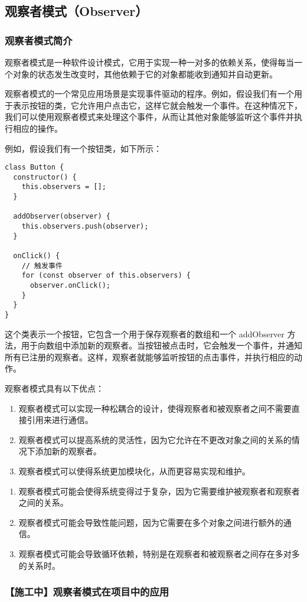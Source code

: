 \subsection{观察者模式（Observer）}

\subsubsection{观察者模式简介}

观察者模式是一种软件设计模式，它用于实现一种一对多的依赖关系，使得每当一个对象的状态发生改变时，其他依赖于它的对象都能收到通知并自动更新。

观察者模式的一个常见应用场景是实现事件驱动的程序。例如，假设我们有一个用于表示按钮的类，它允许用户点击它，这样它就会触发一个事件。在这种情况下，我们可以使用观察者模式来处理这个事件，从而让其他对象能够监听这个事件并执行相应的操作。

例如，假设我们有一个按钮类，如下所示：

\begin{lstlisting}
class Button {
  constructor() {
    this.observers = [];
  }

  addObserver(observer) {
    this.observers.push(observer);
  }

  onClick() {
    // 触发事件
    for (const observer of this.observers) {
      observer.onClick();
    }
  }
}
\end{lstlisting}


这个类表示一个按钮，它包含一个用于保存观察者的数组和一个 addObserver 方法，用于向数组中添加新的观察者。当按钮被点击时，它会触发一个事件，并通知所有已注册的观察者。这样，观察者就能够监听按钮的点击事件，并执行相应的动作。

观察者模式具有以下优点：

\begin{enumerate}
\item 观察者模式可以实现一种松耦合的设计，使得观察者和被观察者之间不需要直接引用来进行通信。
\item 观察者模式可以提高系统的灵活性，因为它允许在不更改对象之间的关系的情况下添加新的观察者。
\item 观察者模式可以使得系统更加模块化，从而更容易实现和维护。
\end{enumerate}

\begin{enumerate}
\item 观察者模式可能会使得系统变得过于复杂，因为它需要维护被观察者和观察者之间的关系。
\item 观察者模式可能会导致性能问题，因为它需要在多个对象之间进行额外的通信。
\item 观察者模式可能会导致循环依赖，特别是在观察者和被观察者之间存在多对多的关系时。
\end{enumerate}

\subsubsection{【施工中】观察者模式在项目中的应用}